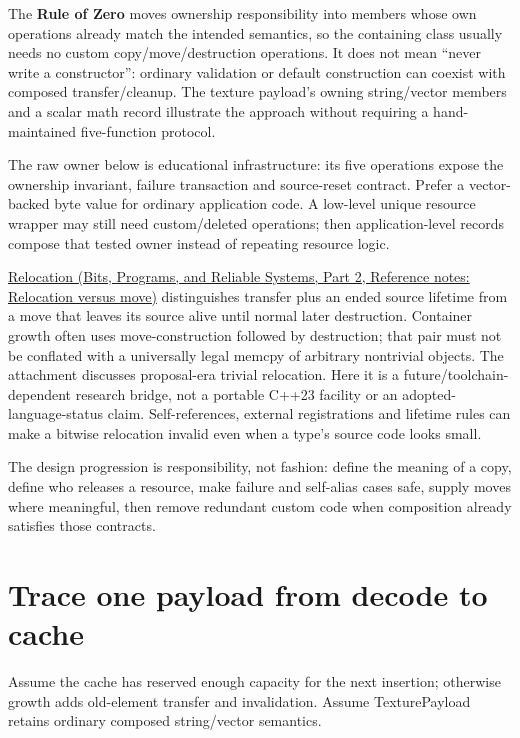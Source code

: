 The \textbf{Rule of Zero} moves ownership responsibility into members whose own operations already match the intended semantics, so the containing class usually needs no custom copy/move/destruction operations. It does not mean ``never write a constructor'': ordinary validation or default construction can coexist with composed transfer/cleanup. The texture payload's owning string/vector members and a scalar math record illustrate the approach without requiring a hand-maintained five-function protocol.

The raw owner below is educational infrastructure: its five operations expose the ownership invariant, failure transaction and source-reset contract. Prefer a vector-backed byte value for ordinary application code. A low-level unique resource wrapper may still need custom/deleted operations; then application-level records compose that tested owner instead of repeating resource logic.

\href{../01-Bits-Programs-and-Reliable-Systems-P02/main.pdf\#nameddest=appendix-adfd6397af8d}{Relocation (Bits, Programs, and Reliable Systems, Part 2, Reference notes: Relocation versus move)} distinguishes transfer plus an ended source lifetime from a move that leaves its source alive until normal later destruction. Container growth often uses move-construction followed by destruction; that pair must not be conflated with a universally legal memcpy of arbitrary nontrivial objects. The attachment discusses proposal-era trivial relocation. Here it is a future/toolchain-dependent research bridge, not a portable C++23 facility or an adopted-language-status claim. Self-references, external registrations and lifetime rules can make a bitwise relocation invalid even when a type's source code looks small.

The design progression is responsibility, not fashion: define the meaning of a copy, define who releases a resource, make failure and self-alias cases safe, supply moves where meaningful, then remove redundant custom code when composition already satisfies those contracts.

\section{Trace one payload from decode to cache}\label{05-engine-i-ch003-trace-one-payload-from-decode-to-cache}

\hypertarget{05-engine-i-ch003-trace-one-payload-from-decode-to-cache}{}

Assume the cache has reserved enough capacity for the next insertion; otherwise growth adds old-element transfer and invalidation. Assume TexturePayload retains ordinary composed string/vector semantics.

